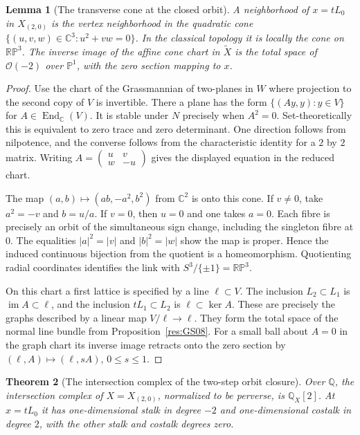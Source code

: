 \documentclass[11pt,oneside,openany]{book}
\newtheorem{theorem}{Theorem}[chapter]
\newtheorem{lemma}[theorem]{Lemma}
\theoremstyle{definition}
\theoremstyle{remark}
\begin{document}
\begin{lemma}[The transverse cone at the closed orbit]
\label{res:GS09}
A neighborhood of \(x=tL_0\) in \(X_{(2,0)}\) is the
vertex neighborhood in the quadratic cone
\(\{(u,v,w)\in\mathbb C^3:u^2+vw=0\}\).
In the classical topology it is locally the cone on
\(\mathbb{RP}^3\). The inverse image of the affine cone
chart in \(\widetilde X\) is the total space of
\(\mathcal O(-2)\) over \(\mathbb P^1\), with the zero
section mapping to \(x\).
\end{lemma}

\begin{proof}
Use the chart of the Grassmannian of two-planes in \(W\)
where projection to the second copy of \(V\) is invertible.
There a plane has the form \(\{(Ay,y):y\in V\}\) for
\(A\in\operatorname{End}_{\mathbb C}(V)\). It is stable
under \(N\) precisely when \(A^2=0\).
Set-theoretically this is equivalent to zero trace and
zero determinant. One direction follows from nilpotence,
and the converse follows from the characteristic identity
for a \(2\) by \(2\) matrix.
Writing \(A=\left(\begin{smallmatrix}u&v\\w&-u\end{smallmatrix}\right)\)
gives the displayed equation in the reduced chart.

The map \((a,b)\mapsto(ab,-a^2,b^2)\) from \(\mathbb C^2\)
is onto this cone. If \(v\ne0\), take \(a^2=-v\) and
\(b=u/a\). If \(v=0\), then \(u=0\) and one takes \(a=0\).
Each fibre is precisely an orbit of the simultaneous sign
change, including the singleton fibre at \(0\).
The equalities \(|a|^2=|v|\) and \(|b|^2=|w|\) show the
map is proper. Hence the induced continuous bijection
from the quotient is a homeomorphism. Quotienting radial
coordinates identifies the link with \(S^3/\{\pm1\}
=\mathbb{RP}^3\).

On this chart a first lattice is specified by a line
\(\ell\subset V\). The inclusion \(L_2\subset L_1\) is
\(\operatorname{im}A\subset\ell\), and the inclusion
\(tL_1\subset L_2\) is \(\ell\subset\ker A\).
These are precisely the graphs described by a linear
map \(V/\ell\to\ell\). They form the total space of the
normal line bundle from Proposition~\ref{res:GS08}.
For a small ball about \(A=0\) in the graph chart its
inverse image retracts onto the zero section by
\((\ell,A)\mapsto(\ell,sA)\), \(0\leq s\leq1\).
\end{proof}

\begin{theorem}[The intersection complex of the two-step orbit closure]
\label{res:GS10}
Over \(\mathbb Q\), the intersection complex of \(X=X_{(2,0)}\),
normalized to be perverse, is \(\mathbb Q_X[2]\).
At \(x=tL_0\) it has one-dimensional stalk in degree \(-2\)
and one-dimensional costalk in degree \(2\), with the other
stalk and costalk degrees zero.
\end{theorem}
\end{document}
